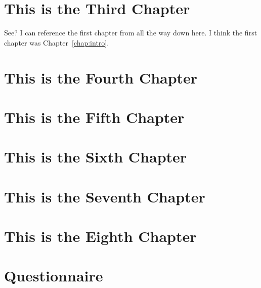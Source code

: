 \documentclass[12pt]{cwru_thesis}
\begin{document}
\chapter{This is the Third Chapter}
See? I can reference the first chapter from all the way down here. I think the first chapter was Chapter~\ref{chap:intro}.
\chapter{This is the Fourth Chapter}
\chapter{This is the Fifth Chapter}
\chapter{This is the Sixth Chapter}
\chapter{This is the Seventh Chapter}
\chapter{This is the Eighth Chapter}


\appendix

\chapter{Questionnaire}

\printbibliography[heading=bibintoc]
\end{document}

